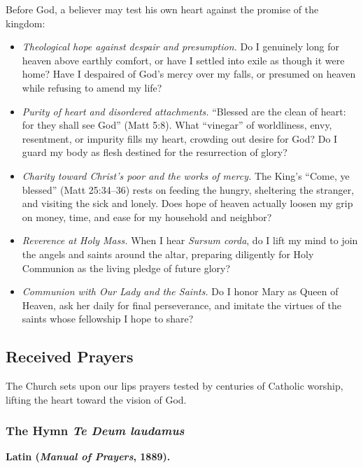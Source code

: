 Before God, a believer may test his own heart against the promise of the kingdom:

\begin{itemize}
\item \textit{Theological hope against despair and presumption.} Do I genuinely long for heaven above earthly comfort, or have I settled into exile as though it were home? Have I despaired of God's mercy over my falls, or presumed on heaven while refusing to amend my life?
\item \textit{Purity of heart and disordered attachments.} ``Blessed are the clean of heart: for they shall see God'' (Matt 5:8). What ``vinegar'' of worldliness, envy, resentment, or impurity fills my heart, crowding out desire for God? Do I guard my body as flesh destined for the resurrection of glory?
\item \textit{Charity toward Christ's poor and the works of mercy.} The King's ``Come, ye blessed'' (Matt 25:34--36) rests on feeding the hungry, sheltering the stranger, and visiting the sick and lonely. Does hope of heaven actually loosen my grip on money, time, and ease for my household and neighbor?
\item \textit{Reverence at Holy Mass.} When I hear \textit{Sursum corda}, do I lift my mind to join the angels and saints around the altar, preparing diligently for Holy Communion as the living pledge of future glory?
\item \textit{Communion with Our Lady and the Saints.} Do I honor Mary as Queen of Heaven, ask her daily for final perseverance, and imitate the virtues of the saints whose fellowship I hope to share?
\end{itemize}

\subsection*{Received Prayers}

The Church sets upon our lips prayers tested by centuries of Catholic worship, lifting the heart toward the vision of God.

\subsubsection*{The Hymn \textit{Te Deum laudamus}}

\textbf{Latin (\textit{Manual of Prayers}, 1889).}

